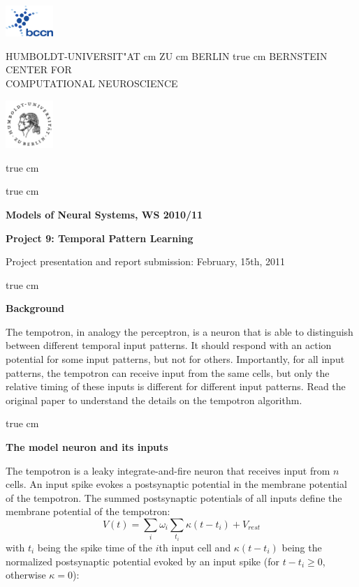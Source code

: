 \documentclass[12pt]{article}
\begin{document}
\parbox{2cm}{
\includegraphics[width=1.8cm]{../bccnlogo.pdf}
}
\parbox{11cm}{
\begin{center}
\large HUMBOLDT-UNIVERSIT"AT  cm ZU  cm BERLIN
 true cm
\mgross BERNSTEIN CENTER FOR\\ COMPUTATIONAL NEUROSCIENCE
\end{center}
}
\parbox{2cm}
{
\hfill
\includegraphics[width=1.8cm]{../hublogo.pdf}
}

 true cm



 true cm
\centerline{\bf Models of Neural Systems, WS 2010/11}
\centerline{\bf Project 9: Temporal Pattern Learning}
\centerline{Project presentation and report submission: February,
15th, 2011}

 true cm

{\bf Background}

The tempotron, in analogy the perceptron, is a neuron that is able to
distinguish between different temporal input patterns. It should
respond with an action potential for some input patterns, but not for
others. Importantly, for all input patterns, the tempotron can receive
input from the same cells, but only the relative timing of these inputs is
different for different input patterns. Read the original paper
\citep{Guetig06} to understand the details on the
tempotron algorithm.

 true cm

{\bf The model neuron and its inputs} 

The tempotron is a leaky integrate-and-fire neuron that receives input
from $n$ cells. An input spike evokes a postsynaptic potential in the
membrane potential of the tempotron. The summed postsynaptic
potentials of all inputs define the membrane potential of the
tempotron: $$V(t)=\sum_i \omega_i \sum_{t_i}\kappa (t - t_i) +
V_{rest}$$ with $t_i$ being the spike time of the $i$th input cell and
$\kappa (t - t_i)$ being the normalized postsynaptic potential evoked
by an input spike (for $t-t_i \ge0$, otherwise $\kappa =0$):
\end{document}
